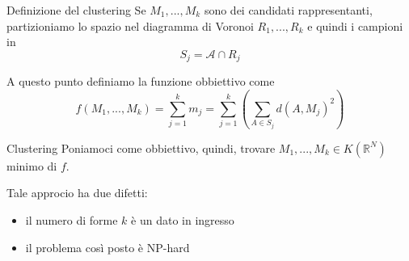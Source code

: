 \documentclass{beamer}
\theoremstyle{plain}
\theoremstyle{definition}
\theoremstyle{remark}
\newcommand{\pa}[1]{\left(#1\right)}
\begin{document}
\begin{frame}{Definizione del clustering}
  Se $M_1,...,M_k$ sono dei candidati rappresentanti, partizioniamo lo
  spazio nel diagramma di Voronoi $R_1,...,R_k$ e quindi i campioni in
  \[ S_j = \mathcal{A} \cap R_j \]
  
  \vfill

  A questo punto definiamo la funzione obbiettivo come
  \[ f(M_1,...,M_k) = \sum _{j = 1} ^k m_j = \sum _{j = 1} ^k \pa{ \sum
    _{A \in S_j} d(A,M_j)^2 } \]
\end{frame}

\begin{frame}{Clustering}
  Poniamoci come obbiettivo, quindi, trovare $M_1,...,M_k \in
  K(\mathbb{R}^N)$ minimo di $f$.
  
  \vfill

  Tale approcio ha due difetti:
  \begin{itemize}
  \item il numero di forme $k$ è un dato in ingresso
  \item il problema così posto è NP-hard
  \end{itemize}
\end{frame}
\end{document}
